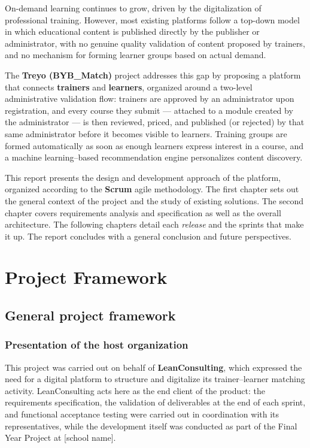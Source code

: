 \documentclass[a4paper,12pt]{report}
\begin{document}
On-demand learning continues to grow, driven by the digitalization of
professional training. However, most existing platforms follow a top-down
model in which educational content is published directly by the publisher
or administrator, with no genuine quality validation of content proposed by
trainers, and no mechanism for forming learner groups based on actual
demand.

The \textbf{Treyo (BYB\_Match)} project addresses this gap by proposing a
platform that connects \textbf{trainers} and \textbf{learners}, organized
around a two-level administrative validation flow: trainers are approved
by an administrator upon registration, and every course they submit ---
attached to a module created by the administrator --- is then reviewed,
priced, and published (or rejected) by that same administrator before it
becomes visible to learners. Training groups are formed automatically as
soon as enough learners express interest in a course, and a machine
learning--based recommendation engine personalizes content discovery.

This report presents the design and development approach of the platform,
organized according to the \textbf{Scrum} agile methodology. The first
chapter sets out the general context of the project and the study of
existing solutions. The second chapter covers requirements analysis and
specification as well as the overall architecture. The following chapters
detail each \emph{release} and the sprints that make it up. The report
concludes with a general conclusion and future perspectives.

\chapter{Project Framework}

\section{General project framework}

\subsection{Presentation of the host organization}
This project was carried out on behalf of \textbf{LeanConsulting}, which
expressed the need for a digital platform to structure and digitalize its
trainer--learner matching activity. LeanConsulting acts here as the end
client of the product: the requirements specification, the validation of
deliverables at the end of each sprint, and functional acceptance testing
were carried out in coordination with its representatives, while the
development itself was conducted as part of the Final Year Project at
[school name].
\end{document}
